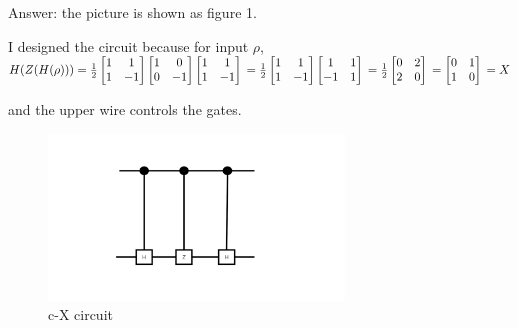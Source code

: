 \documentclass{article}
\begin{document}
\begin{enumerate}
          Answer: the picture is shown as figure 1.

          I designed the circuit because for input $\rho$, $H(Z(H(\rho)))
              =\frac{1}{2}\begin{bmatrix}
                  1 & 1  \\
                  1 & -1 \\
              \end{bmatrix}\begin{bmatrix}
                  1 & 0  \\
                  0 & -1 \\
              \end{bmatrix}\begin{bmatrix}
                  1 & 1  \\
                  1 & -1 \\
              \end{bmatrix}
              \\=\frac{1}{2}\begin{bmatrix}
                  1 & 1  \\
                  1 & -1 \\
              \end{bmatrix}\begin{bmatrix}
                  1  & 1 \\
                  -1 & 1 \\
              \end{bmatrix}
              \\=\frac{1}{2}\begin{bmatrix}
                  0 & 2 \\
                  2 & 0 \\
              \end{bmatrix}
              \\=\begin{bmatrix}
                  0 & 1 \\
                  1 & 0 \\
              \end{bmatrix}
              \\=X
          $

          and the upper wire controls the gates.

          \begin{figure}[b]
              \centering
              \includegraphics[width=0.7\textwidth]{circuit.pdf}
              \caption{c-X circuit}
          \end{figure}



\end{enumerate}
\end{document}
